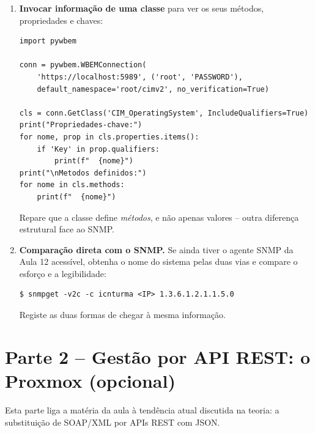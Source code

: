 \documentclass[11pt,a4paper]{article}
\begin{document}
\begin{enumerate}[label=\arabic*.]
  \item \textbf{Invocar informação de uma classe} para ver os seus métodos, propriedades e chaves:
\begin{lstlisting}
import pywbem

conn = pywbem.WBEMConnection(
    'https://localhost:5989', ('root', 'PASSWORD'),
    default_namespace='root/cimv2', no_verification=True)

cls = conn.GetClass('CIM_OperatingSystem', IncludeQualifiers=True)
print("Propriedades-chave:")
for nome, prop in cls.properties.items():
    if 'Key' in prop.qualifiers:
        print(f"  {nome}")
print("\nMetodos definidos:")
for nome in cls.methods:
    print(f"  {nome}")
\end{lstlisting}
  Repare que a classe define \emph{métodos}, e não apenas valores -- outra diferença estrutural face ao SNMP.

  \item \textbf{Comparação direta com o SNMP.} Se ainda tiver o agente SNMP da Aula 12 acessível, obtenha o nome do sistema pelas duas vias e compare o esforço e a legibilidade:
\begin{lstlisting}
$ snmpget -v2c -c icnturma <IP> 1.3.6.1.2.1.1.5.0
\end{lstlisting}
  Registe as duas formas de chegar à mesma informação.

\end{enumerate}

\section{Parte 2 -- Gestão por API REST: o Proxmox (opcional)}
Esta parte liga a matéria da aula à tendência atual discutida na teoria: a substituição de SOAP/XML por APIs REST com JSON.
\end{document}
